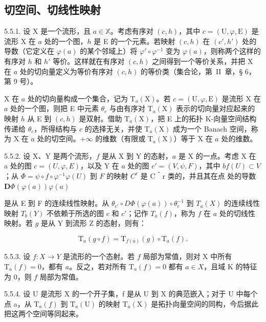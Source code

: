 \subsection{切空间、切线性映射}

5.5.1. 设 X 是一个流形，且 \(a\in\mathbb{X}\)。考虑有序对 \((c,h)\)，其中 \(c=(\mathrm{U},\varphi,\mathrm{E})\) 是流形 X 在 \(a\) 处的一个图，\(h\) 是 E 的一个元素。若映射 \((c,h)\) 在 \((c',h')\) 处的导数（它定义在 \(\varphi(a)\) 的某个邻域上）将 \(\varphi'\circ\varphi^{-1}\) 变为 \(\varphi(a)\)，则称两个这样的有序对 \(h\) 和 \(h'\) 等价。这样就在有序对 \((c,h)\) 之间得到一个等价关系，并把 X 在 \(a\) 处的切向量定义为等价有序对 \((c,h)\) 的等价类（集合论，第~II~章，§ 6，第 9 号）。

X 在 \(a\) 处的切向量构成一个集合，记为 \(\mathrm{T}_{a}(\mathrm{X})\)。若 \(c = (\mathrm{U}, \varphi, \mathrm{E})\) 是流形 X 在 \(a\) 处的一个图，则把 E 中元素 \(\theta_{c}\) 与由有序对 \(\mathrm{T}_{a}(\mathrm{X})\) 表示的切向量对应起来的映射 \(h\) 从 E 到 \((c, h)\) 是双射。借助 \(\mathrm{T}_{a}(\mathrm{X})\)，把 E 上的拓扑 K-向量空间结构传递给 \(\theta_{c}\)，所得结构与 \(c\) 的选择无关，并使 \(\mathrm{T}_{a}(\mathrm{X})\) 成为一个 Banach 空间，称为 X 在 \(a\) 处的切空间。\(+\infty\) 的维数（有限或 \(\mathrm{T}_{a}(\mathrm{X})\)）等于 X 在 \(a\) 处的维数。

5.5.2. 设 X、Y 是两个流形，\(f\) 是从 X 到 Y 的态射，\(a\) 是 X 的一点。考虑 X 在 a 处的图 \(c = (U, \varphi, E)\)，以及 Y 在 \(a\) 处的图 \(c' = (V, \psi, F)\)，其中 \(b\)\(f(U) \subset V\)；从 \(\Phi = \psi \circ f \circ \varphi^{-1}\)\(\varphi(U)\) 到 \(F\) 的映射 \(C^{r}\) 是 C＾r 类的，并且其在点  处的导数 \(\mathbf{D}\Phi(\varphi(a))\)\(\varphi(a)\)

是从 E 到 F 的连续线性映射。从 \(\theta_{c'} \circ D\Phi(\varphi(a)) \circ \theta_{c}^{-1}\) 到 \(T_{a}(X)\) 的连续线性映射 \(T_{b}(Y)\) 不依赖于所选的图 \(c\) 和 \(c'\)；记作 \(T_{a}(f)\)，称为 \(f\) 在 \(a\) 处的切线性映射。若 \(g\) 是从 Y 到流形 Z 的态射，则有：

\[
\mathrm{T} _ {a} (g \circ f) = \mathrm{T} _ {f (a)} (g) \circ \mathrm{T} _ {a} (f).
\]

5.5.3. 设 \(f:X\to Y\) 是流形的一个态射。若 \(f\) 局部为常值，则对 X 中所有 \(\mathrm{T}_{a}(f)=0\)，都有 \(a\)。反之，若对所有 \(\mathrm{T}_{a}(f)=0\) 都有 \(a\in X\)，且域 K 的特征为 0，则 \(f\) 局部为常值。

5.5.4. 设 U 是流形 X 的一个开子集，f 是从 U 到 X 的典范嵌入；对于 U 中每个点 a，从 \(\mathrm{T}_{a}(f)\) 到 \(\mathrm{T}_{a}(\mathrm{U})\) 的映射 \(\mathrm{T}_{a}(\mathrm{X})\) 是拓扑向量空间的同构，今后据此把这两个空间等同起来。

